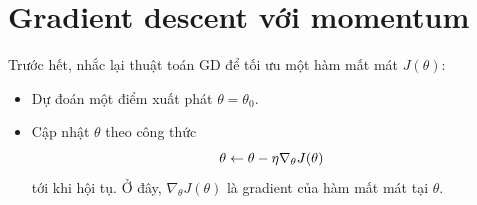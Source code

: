 




\newpage
\section{Gradient descent với momentum}



Trước hết, nhắc lại thuật toán GD để tối ưu một hàm mất mát $J(\theta)$:
\begin{itemize}
\item  Dự đoán một điểm xuất phát $\theta = \theta_0$.
\item  Cập nhật $\theta$ theo công thức
\begin{equation}
\theta \leftarrow \theta - \eta \nabla_{\theta}J(\theta)
\end{equation}
tới khi hội tụ. Ở đây, $\nabla_{\theta}J(\theta)$ là gradient của hàm mất mát tại $\theta$.
\end{itemize}


